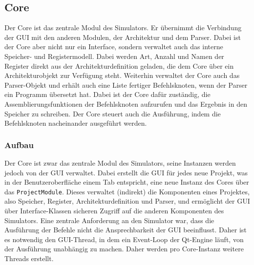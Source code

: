 \subsection{Core}
\label{Dev-Kapitel: Core}

Der Core ist das zentrale Modul des Simulators. Er übernimmt die Verbindung der
GUI mit den anderen Modulen, der Architektur und dem Parser. Dabei ist der Core
aber nicht nur ein Interface, sondern verwaltet auch das interne Speicher- und
Registermodell. Dabei werden Art, Anzahl und Namen der Register direkt aus der
Architekturdefinition geladen, die dem Core über ein Architekturobjekt zur
Verfügung steht. Weiterhin verwaltet der Core auch das Parser-Objekt und erhält
auch eine Liste fertiger Befehlsknoten, wenn der Parser ein Programm übersetzt
hat. Dabei ist der Core dafür zuständig, die Assemblierungsfunktionen der
Befehlsknoten aufzurufen und das Ergebnis in den Speicher zu schreiben. Der Core
steuert auch die Ausführung, indem die Befehlsknoten nacheinander ausgeführt
werden.

\subsubsection{Aufbau}

Der Core ist zwar das zentrale Modul des Simulators, seine Instanzen werden
jedoch von der GUI verwaltet. Dabei erstellt die GUI für jedes neue Projekt, was
in der Benutzeroberfläche einem Tab entspricht, eine neue Instanz des Cores über
das \texttt{ProjectModule}. Dieses verwaltet (indirekt) die Komponenten eines
Projektes, also Speicher, Register, Architekturdefinition und Parser, und
ermöglicht der GUI über Interface-Klassen sicheren Zugriff auf die anderen
Komponenten des Simulators. Eine zentrale Anforderung an den Simulator war, dass
die Ausführung der Befehle nicht die Ansprechbarkeit der GUI beeinflusst. Daher
ist es notwendig den GUI-Thread, in dem ein Event-Loop der Qt-Engine läuft, von
der Ausführung unabhängig zu machen. Daher werden pro Core-Instanz weitere
Threads erstellt.

